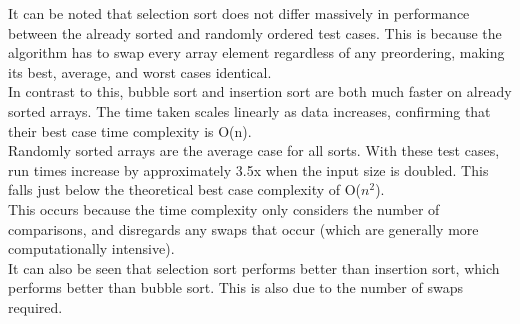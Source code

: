 \documentclass{article}
\begin{document}
It can be noted that selection sort
does not differ massively in performance between
the already sorted and randomly ordered
test cases. This is because the algorithm
has to swap every array element regardless
of any preordering, making its best, average, and worst
cases identical.\\
In contrast to this, bubble sort and insertion sort
are both much faster on already sorted arrays.
The time taken scales linearly as data increases,
confirming that their best case time complexity is O(n).\\
Randomly sorted arrays are the average case for all sorts.
With these test cases, run times increase by approximately
3.5x when the input size is doubled. This falls just below
the theoretical best case complexity of O($n^2$).\\
This occurs because the time complexity only considers the number
of comparisons, and disregards any swaps that occur
(which are generally more computationally intensive).\\
It can also be seen that selection sort performs better than insertion
sort, which performs better than bubble sort. This is also due to the 
number of swaps required.
\end{document}

